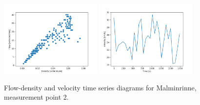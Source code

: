 \documentclass[english, 12pt, a4paper, elec, utf8, pdfa, online]{aaltothesis}
\begin{document}
\begin{figure}[ht!]
    \centering
    \includegraphics[width=0.45\textwidth]{graphs/Malminrinne_2_flw_dns.png}
    \includegraphics[width=0.45\textwidth]{graphs/Malminrinne_2_spd_time_6.png}
    \caption{Flow-density and velocity time series diagrams for Malminrinne, measurement point 2.}
\end{figure}
\end{document}
